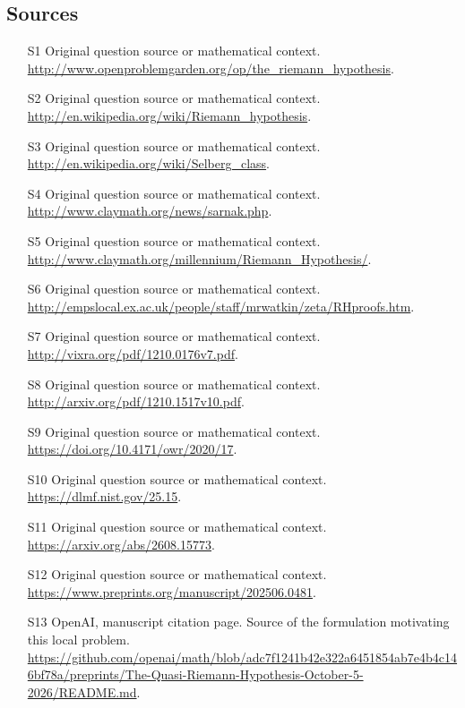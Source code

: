 \documentclass[11pt]{article}
\begin{document}
\subsection{Sources}
\begin{itemize}
\item[S1] Original question source or mathematical context.
\url{http://www.openproblemgarden.org/op/the_riemann_hypothesis}.
\item[S2] Original question source or mathematical context.
\url{http://en.wikipedia.org/wiki/Riemann_hypothesis}.
\item[S3] Original question source or mathematical context.
\url{http://en.wikipedia.org/wiki/Selberg_class}.
\item[S4] Original question source or mathematical context.
\url{http://www.claymath.org/news/sarnak.php}.
\item[S5] Original question source or mathematical context.
\url{http://www.claymath.org/millennium/Riemann_Hypothesis/}.
\item[S6] Original question source or mathematical context.
\url{http://empslocal.ex.ac.uk/people/staff/mrwatkin/zeta/RHproofs.htm}.
\item[S7] Original question source or mathematical context.
\url{http://vixra.org/pdf/1210.0176v7.pdf}.
\item[S8] Original question source or mathematical context.
\url{http://arxiv.org/pdf/1210.1517v10.pdf}.
\item[S9] Original question source or mathematical context.
\url{https://doi.org/10.4171/owr/2020/17}.
\item[S10] Original question source or mathematical context.
\url{https://dlmf.nist.gov/25.15}.
\item[S11] Original question source or mathematical context.
\url{https://arxiv.org/abs/2608.15773}.
\item[S12] Original question source or mathematical context.
\url{https://www.preprints.org/manuscript/202506.0481}.
\item[S13] OpenAI, manuscript citation page. Source of the formulation motivating this local problem.
\url{https://github.com/openai/math/blob/adc7f1241b42e322a6451854ab7e4b4c146bf78a/preprints/The-Quasi-Riemann-Hypothesis-October-5-2026/README.md}.
\end{itemize}
\end{document}
